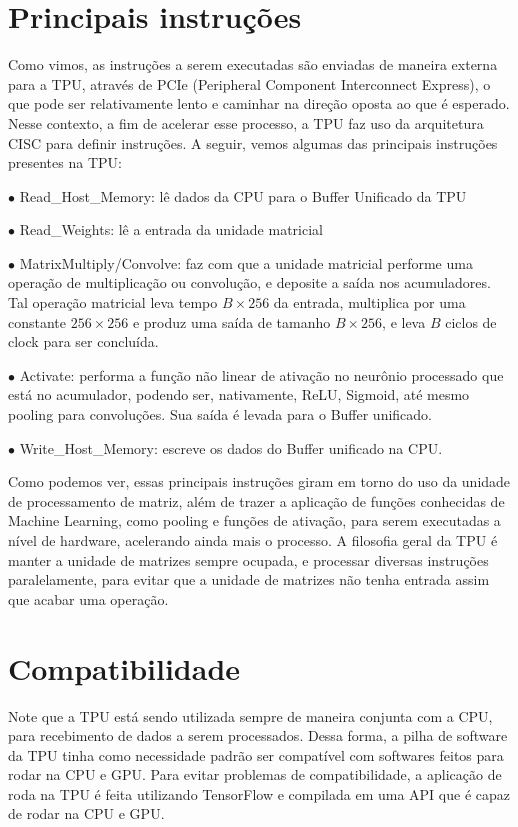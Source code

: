 \documentclass{report}
\begin{document}
\section{Principais instruções}

Como vimos, as instruções a serem executadas são enviadas de maneira externa para a TPU, através de PCIe (Peripheral Component Interconnect Express), o que pode ser relativamente lento e caminhar na direção oposta ao que é esperado. Nesse contexto, a fim de acelerar esse processo, a TPU faz uso da arquitetura CISC para definir instruções. A seguir, vemos algumas das principais instruções presentes na TPU:

$\bullet$ Read\_Host\_Memory: lê dados da CPU para o Buffer Unificado da TPU

$\bullet$ Read\_Weights: lê a entrada da unidade matricial

$\bullet$ MatrixMultiply/Convolve: faz com que a unidade matricial performe uma operação de multiplicação ou convolução, e deposite a saída nos acumuladores. Tal operação matricial leva tempo $B \times 256$ da entrada, multiplica por uma constante $256 \times 256$ e produz uma saída de tamanho $B \times 256$, e leva $B$ ciclos de clock para ser concluída.

$\bullet$ Activate: performa a função não linear de ativação no neurônio processado que está no acumulador, podendo ser, nativamente, ReLU, Sigmoid, até mesmo pooling para convoluções. Sua saída é levada para o Buffer unificado.

$\bullet$ Write\_Host\_Memory: escreve os dados do Buffer unificado na CPU.

Como podemos ver, essas principais instruções giram em torno do uso da unidade de processamento de matriz, além de trazer a aplicação de funções conhecidas de Machine Learning, como pooling e funções de ativação, para serem executadas a nível de hardware, acelerando ainda mais o processo. A filosofia geral da TPU é manter a unidade de matrizes sempre ocupada, e processar diversas instruções paralelamente, para evitar que a unidade de matrizes não tenha entrada assim que acabar uma operação.

\section{Compatibilidade}

Note que a TPU está sendo utilizada sempre de maneira conjunta com a CPU, para recebimento de dados a serem processados. Dessa forma, a pilha de software da TPU tinha como necessidade padrão ser compatível com softwares feitos para rodar na CPU e GPU. Para evitar problemas de compatibilidade, a aplicação de roda na TPU é feita utilizando TensorFlow e compilada em uma API que é capaz de rodar na CPU e GPU.
\end{document}
